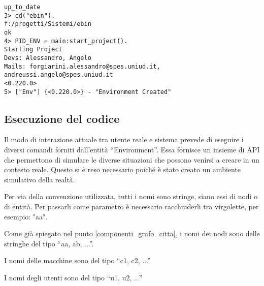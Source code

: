 \begin{lstlisting}
up_to_date
3> cd("ebin").
f:/progetti/Sistemi/ebin
ok
4> PID_ENV = main:start_project().
Starting Project
Devs: Alessandro, Angelo
Mails: forgiarini.alessandro@spes.uniud.it, andreussi.angelo@spes.uniud.it
<0.220.0>
5> ["Env"] {<0.220.0>} - "Environment Created"
\end{lstlisting}

\subsection{Esecuzione del codice}\label{esecuzione_codice}
Il modo di interazione attuale tra utente reale e sistema prevede di eseguire i diversi comandi forniti dall'entità ``Environment''. Essa fornisce un insieme di API che permettono di simulare le diverse situazioni che possono venirsi a creare in un contesto reale. Questo si è reso necessario poiché è stato creato un ambiente simulativo della realtà.

Per via della convenzione utilizzata, tutti i nomi sono stringe, siano essi di nodi o di entità. Per passarli come parametro è necessario racchiuderli tra virgolette, per esempio: "aa".

Come già spiegato nel punto \ref{componenti_grafo_citta}, i nomi dei nodi sono delle stringhe del tipo ``aa, ab, ...''.

I nomi delle macchine sono del tipo ``c1, c2, ...''

I nomi degli utenti sono del tipo ``u1, u2, ...''

